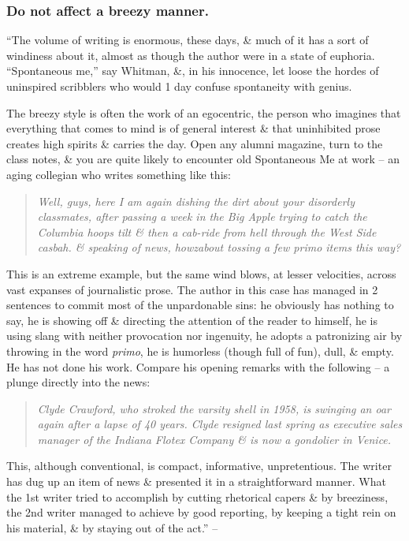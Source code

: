 \documentclass{article}
\begin{document}

\subsubsection{Do not affect a breezy manner.}
``The volume of writing is enormous, these days, \& much of it has a sort of windiness about it, almost as though the author were in a state of euphoria. ``Spontaneous me,'' say Whitman, \&, in his innocence, let loose the hordes of uninspired scribblers who would 1 day confuse spontaneity with genius.

The breezy style is often the work of an egocentric, the person who imagines that everything that comes to mind is of general interest \& that uninhibited prose creates high spirits \& carries the day. Open any alumni magazine, turn to the class notes, \& you are quite likely to encounter old Spontaneous Me at work -- an aging collegian who writes something like this:
\begin{quotation}\it
	Well, guys, here I am again dishing the dirt about your disorderly classmates, after passing a week in the Big Apple trying to catch the Columbia hoops tilt \& then a cab-ride from hell through the West Side casbah. \& speaking of news, howzabout tossing a few primo items this way?
\end{quotation}
This is an extreme example, but the same wind blows, at lesser velocities, across vast expanses of journalistic prose. The author in this case has managed in 2 sentences to commit most of the unpardonable sins: he obviously has nothing to say, he is showing off \& directing the attention of the reader to himself, he is using slang with neither provocation nor ingenuity, he adopts a patronizing air by throwing in the word {\it primo}, he is humorless (though full of fun), dull, \& empty. He has not done his work. Compare his opening remarks with the following -- a plunge directly into the news:
\begin{quotation}\it
	Clyde Crawford, who stroked the varsity shell in 1958, is swinging an oar again after a lapse of 40 years. Clyde resigned last spring as executive sales manager of the Indiana Flotex Company \& is now a gondolier in Venice.
\end{quotation}
This, although conventional, is compact, informative, unpretentious. The writer has dug up an item of news \& presented it in a straightforward manner. What the 1st writer tried to accomplish by cutting rhetorical capers \& by breeziness, the 2nd writer managed to achieve by good reporting, by keeping a tight rein on his material, \& by staying out of the act.'' -- \cite[p. 87]{Strunk_White_element_style}
\end{document}

